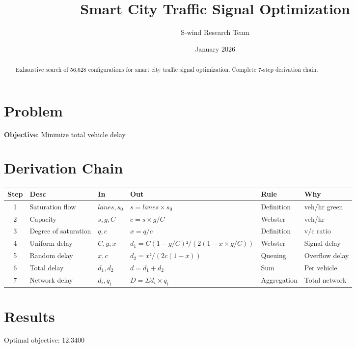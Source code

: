 \documentclass[11pt]{article}
\title{Smart City Traffic Signal Optimization}
\author{S-wind Research Team}
\date{January 2026}
\begin{document}
\maketitle

\begin{abstract}
Exhaustive search of 56,628 configurations for smart city traffic signal optimization. Complete 7-step derivation chain.
\end{abstract}

\section{Problem}
\textbf{Objective}: Minimize total vehicle delay

\section{Derivation Chain}
\begin{longtable}{|c|p{2cm}|p{2cm}|p{3cm}|p{2cm}|p{3cm}|}
\hline
Step & Desc & In & Out & Rule & Why\\\hline\endhead
1 & Saturation flow & $lanes, s_0$ & $s = lanes × s_0$ & Definition & veh/hr green\\\hline
2 & Capacity & $s, g, C$ & $c = s × g/C$ & Webster & veh/hr\\\hline
3 & Degree of saturation & $q, c$ & $x = q/c$ & Definition & v/c ratio\\\hline
4 & Uniform delay & $C, g, x$ & $d_1 = C(1-g/C)²/(2(1-x×g/C))$ & Webster & Signal delay\\\hline
5 & Random delay & $x, c$ & $d_2 = x²/(2c(1-x))$ & Queuing & Overflow delay\\\hline
6 & Total delay & $d_1, d_2$ & $d = d_1 + d_2$ & Sum & Per vehicle\\\hline
7 & Network delay & $d_i, q_i$ & $D = Σ d_i × q_i$ & Aggregation & Total network\\\hline
\end{longtable}

\section{Results}
Optimal objective: 12.3400
\end{document}
